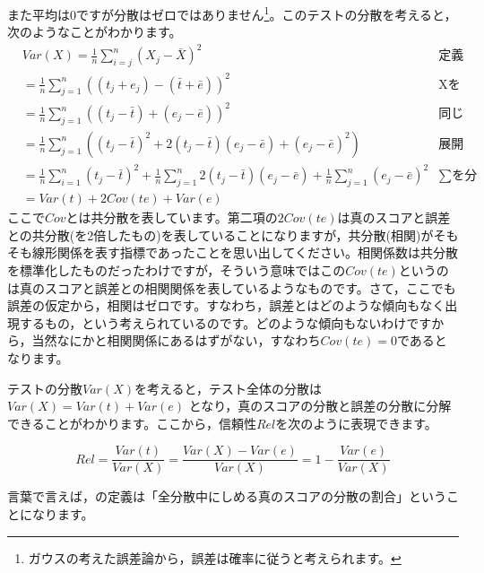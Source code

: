\documentclass{ltjsbook}
\begin{document}
また平均は$0$ですが分散はゼロではありません\footnote{ガウスの考えた誤差論から，誤差は確率に従うと考えられます。}。このテストの分散を考えると，次のようなことがわかります。
\begin{align*}
	 & Var(X)  =  \frac{1}{n}\sum_{i=j}^n (X_j - \bar{X})^2                                                                                              & \mbox{定義より}         \\
	 & = \frac{1}{n}\sum_{j=1}^n  ((t_j + e_j) - (\bar{t} + \bar{e}))^2                                                                                  & \mbox{Xをテスト理論のモデルに} \\
	 & = \frac{1}{n}\sum_{j=1}^n (  (t_j - \bar{t}) + (e_j - \bar{e}) )^2                                                                                & \mbox{同じ記号でまとめる}    \\
	 & = \frac{1}{n}\sum_{j=1}^n (  (t_j - \bar{t})^2 + 2(t_j - \bar{t})(e_j - \bar{e}) + (e_j - \bar{e})^2  )                                           & \mbox{展開する}         \\
	 & = \frac{1}{n}\sum_{i=1}^n (t_j - \bar{t})^2 +\frac{1}{n}\sum_{j=1}^n 2(t_j - \bar{t})(e_j - \bar{e})  + \frac{1}{n}\sum_{j=1}^n (e_j - \bar{e})^2 & \mbox{$\sum$を分配}    \\
	 & =  Var(t) + 2Cov(te) + Var(e)
\end{align*}
ここで$Cov$とは共分散を表しています。第二項の$2Cov(te)$は真のスコアと誤差との共分散(を2倍したもの)を表していることになりますが，共分散(相関)がそもそも線形関係を表す指標であったことを思い出してください。相関係数は共分散を標準化したものだったわけですが，そういう意味ではこの$Cov(te)$というのは真のスコアと誤差との相関関係を表しているようなものです。さて，ここでも誤差の仮定から，相関はゼロです。すなわち，誤差とはどのような傾向もなく出現するもの，という考えられているのです。どのような傾向もないわけですから，当然なにかと相関関係にあるはずがない，すなわち$Cov(te)=0$であるとなります。

テストの分散$Var(X)$を考えると，テスト全体の分散は$Var(X)=Var(t)+Var(e)$ となり，真のスコアの分散と誤差の分散に分解できることがわかります。ここから，信頼性$Rel$を次のように表現できます。

\[Rel = \frac{Var(t)}{Var(X)}= \frac{Var(X)-Var(e)}{Var(X)} = 1-\frac{Var(e)}{Var(X)}\]

言葉で言えば，の定義は「全分散中にしめる真のスコアの分散の割合」ということになります。
\end{document}
